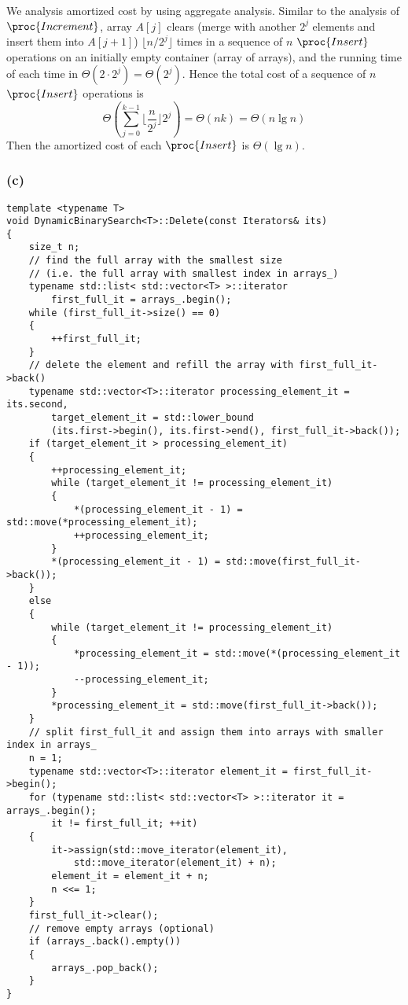 We analysis amortized cost by using aggregate analysis.
Similar to the analysis of $\proc{Increment}$,
array $A[j]$ clears (merge with another $2^j$ elements 
and insert them into $A[j+1]$) 
$\lfloor n / 2^j \rfloor$ times
in a sequence of $n$ $\proc{Insert}$ operations on an initially
empty container (array of arrays),
and the running time of each time in $\Theta(2 \cdot 2^j) = \Theta(2^j)$.
Hence the total cost of a sequence of $n$ $\proc{Insert}$ operations is
\begin{equation*}
    \Theta(\sum\limits_{j = 0}^{k - 1} \lfloor \frac{n}{2^j} \rfloor 2^j)
    = \Theta(n k) = \Theta(n \lg n)
\end{equation*}
Then the amortized cost of each $\proc{Insert}$ is $\Theta(\lg n)$.

\subsubsection*{(c)}

\begin{verbatim}
template <typename T>
void DynamicBinarySearch<T>::Delete(const Iterators& its)
{
    size_t n;
    // find the full array with the smallest size 
    // (i.e. the full array with smallest index in arrays_)
    typename std::list< std::vector<T> >::iterator 
        first_full_it = arrays_.begin();
    while (first_full_it->size() == 0)
    {
        ++first_full_it;
    }
    // delete the element and refill the array with first_full_it->back()
    typename std::vector<T>::iterator processing_element_it = its.second,
        target_element_it = std::lower_bound
        (its.first->begin(), its.first->end(), first_full_it->back());
    if (target_element_it > processing_element_it)
    {
        ++processing_element_it;
        while (target_element_it != processing_element_it)
        {
            *(processing_element_it - 1) = std::move(*processing_element_it);
            ++processing_element_it;
        }
        *(processing_element_it - 1) = std::move(first_full_it->back());
    }
    else
    {
        while (target_element_it != processing_element_it)
        {
            *processing_element_it = std::move(*(processing_element_it - 1));
            --processing_element_it;
        }
        *processing_element_it = std::move(first_full_it->back());
    }
    // split first_full_it and assign them into arrays with smaller index in arrays_
    n = 1;
    typename std::vector<T>::iterator element_it = first_full_it->begin();
    for (typename std::list< std::vector<T> >::iterator it = arrays_.begin();
        it != first_full_it; ++it)
    {
        it->assign(std::move_iterator(element_it), 
            std::move_iterator(element_it) + n);
        element_it = element_it + n;
        n <<= 1;
    }
    first_full_it->clear();
    // remove empty arrays (optional)
    if (arrays_.back().empty())
    {
        arrays_.pop_back();
    }
}
\end{verbatim}

